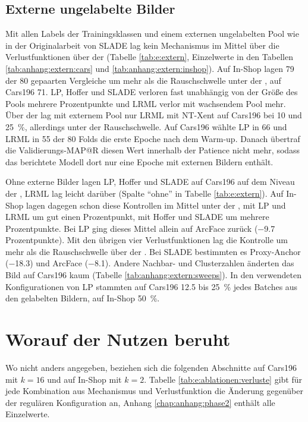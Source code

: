 \subsection{Externe ungelabelte Bilder}
\label{sec:e:extern}



Mit allen Labels der Trainingsklassen und einem externen ungelabelten Pool wie in der Originalarbeit von \ac{SLADE} lag kein Mechanismus im Mittel über die Verlustfunktionen über der \UEBL (Tabelle \ref{tab:e:extern}, Einzelwerte in den Tabellen \ref{tab:anhang:extern:cars} und \ref{tab:anhang:extern:inshop}). Auf In-Shop lagen 79 der 80 gepaarten Vergleiche um mehr als die Rauschschwelle unter der \UEBL, auf Cars196 71. \ac{LP}, Hoffer und \ac{SLADE} verloren fast unabhängig von der Größe des Pools mehrere Prozentpunkte und \ac{LRML} verlor mit wachsendem Pool mehr. Über der \UEBL lag mit externem Pool nur \ac{LRML} mit \ac{NT-Xent} auf Cars196 bei 10 und \qty{25}{\percent}, allerdings unter der Rauschschwelle. Auf Cars196 wählte \ac{LP} in 66 und \ac{LRML} in 55 der 80 Folds die erste Epoche nach dem Warm-up. Danach übertraf die Validierungs-\ac{MAP@R} diesen Wert innerhalb der Patience nicht mehr, sodass das berichtete Modell dort nur eine Epoche mit externen Bildern enthält.%


Ohne externe Bilder lagen \ac{LP}, Hoffer und \ac{SLADE} auf Cars196 auf dem Niveau der \UEBL, \ac{LRML} lag leicht darüber (Spalte \enquote{ohne} in Tabelle \ref{tab:e:extern}). Auf In-Shop lagen dagegen schon diese Kontrollen im Mittel unter der \UEBL, mit \ac{LP} und \ac{LRML} um gut einen Prozentpunkt, mit Hoffer und \ac{SLADE} um mehrere Prozentpunkte. Bei \ac{LP} ging dieses Mittel allein auf ArcFace zurück (\num{-9.7} Prozentpunkte). Mit den übrigen vier Verlustfunktionen lag die Kontrolle um mehr als die Rauschschwelle über der \UEBL. Bei \ac{SLADE} bestimmten es Proxy-Anchor (\num{-18.3}) und ArcFace (\num{-8.1}). Andere Nachbar- und Clusterzahlen änderten das Bild auf Cars196 kaum (Tabelle \ref{tab:anhang:extern:sweeps}). In den verwendeten Konfigurationen von \ac{LP} stammten auf Cars196 \num{12.5} bis \qty{25}{\percent} jedes Batches aus den gelabelten Bildern, auf In-Shop \qty{50}{\percent}.%



\section{Worauf der Nutzen beruht}
\label{sec:e:phase2}
Wo nicht anders angegeben, beziehen sich die folgenden Abschnitte auf Cars196 mit $k=16$ und auf In-Shop mit $k=2$. Tabelle \ref{tab:e:ablationen:verluste} gibt für jede Kombination aus Mechanismus und Verlustfunktion die Änderung gegenüber der regulären Konfiguration an, Anhang \ref{chap:anhang:phase2} enthält alle Einzelwerte. 

